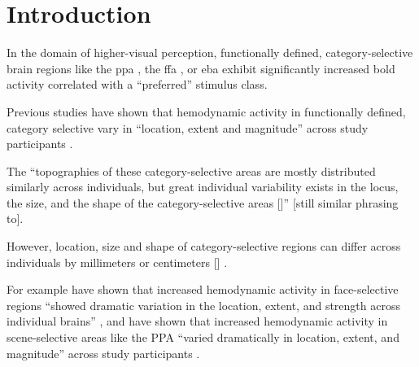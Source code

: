 



\section{Introduction}

In the domain of higher-visual perception, functionally defined,
category-selective brain regions like the \ac{ppa} \citep{epstein1998ppa}, the
\ac{ffa} \citep{kanwisher1997ffa}, or \ac{eba} \citep{downing2001bodyarea}
exhibit significantly increased \ac{bold} activity correlated with a
``preferred'' \citep{debeck2008interpreting} stimulus class.


Previous studies have shown that hemodynamic activity in functionally defined,
category selective vary in ``location, extent and magnitude'' across study
participants \citep{rosenke2021probabilistic, frost2012measuring,
zhen2017quantifying, zhen2015quantifying}.

The ``topographies of these category-selective areas are mostly distributed
similarly across individuals, but great individual variability exists in the
locus, the size, and the shape of the category-selective areas
[\citep{rosenke2021probabilistic, zhen2017quantifying, zhen2015quantifying,
frost2012measuring}]'' [still similar phrasing to\citep{jiahui2020predicting}].

However, location, size and shape of category-selective regions can differ
across individuals by millimeters or centimeters [\citep{zhen2017quantifying,
zhen2015quantifying}] \citep{feilong2018reliable}.



For example \citet{zhen2015quantifying} have shown that increased hemodynamic
activity in face-selective regions ``showed dramatic variation in the location,
extent, and strength across individual brains'' \citep{zhen2015quantifying}, and
\citet{zhen2017quantifying} have shown that increased hemodynamic activity in
scene-selective areas like the PPA ``varied dramatically in location, extent,
and magnitude'' across study participants \citep{zhen2017quantifying}.

